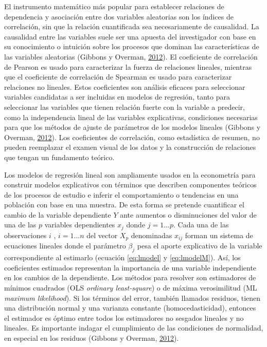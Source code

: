 \documentclass[12pt,a4paper,oneside, openany]{book}
\theoremstyle{definition}
\theoremstyle{definition}
\theoremstyle{definition}
\theoremstyle{remark}
\begin{document}
El instrumento matemático más popular para establecer relaciones de
dependencia y asociación entre dos variables aleatorias son los índices
de correlación, sin que la relación cuantificada sea necesariamente de
causalidad. La causalidad entre las variables suele ser una apuesta del
investigador con base en su conocimiento o intuición sobre los procesos
que dominan las características de las variables aleatorias (Gibbons y
Overman, \protect\hyperlink{ref-gibbons_mostly_2012}{2012}). El
coeficiente de correlación de Pearson es usado para caracterizar la
fuerza de relaciones lineales, mientras que el coeficiente de
correlación de Spearman es usado para caracterizar relaciones no
lineales. Estos coeficientes son análisis eficaces para seleccionar
variables candidatas a ser incluidas en modelos de regresión, tanto para
seleccionar las variables que tienen relación fuerte con la variable a
predecir, como la independencia lineal de las variables explicativas,
condiciones necesarias para que los métodos de ajuste de parámetros de
los modelos lineales (Gibbons y Overman,
\protect\hyperlink{ref-gibbons_mostly_2012}{2012}). Los coeficientes de
correlación, como estadística de resumen, no pueden reemplazar el examen
visual de los datos y la construcción de relaciones que tengan un
fundamento teórico.

Los modelos de regresión lineal son ampliamente usados en la econometría
para construir modelos explicativos con términos que describen
componentes teóricos de los procesos de estudio e inferir el
comportamiento o tendencias en una población con base en una muestra. De
esta forma se pretende cuantificar el cambio de la variable dependiente
\(Y\) ante aumentos o disminuciones del valor de una de las \(p\)
variables dependientes \(x_j\) donde \(j =1...p\). Cada una de las
observaciones \(i\) , \(i=1...n\) del vector \(X_p\) denominadas
\(x_{ij}\) forman un sistema de ecuaciones lineales donde el parámetro
\(\beta_j\) pesa el aporte explicativo de la variable correspondiente al
estimarlo (ecuación \eqref{eq:lmodel} y \eqref{eq:lmodelM}). Así, los
coeficientes estimados representan la importancia de una variable
independiente en los cambios de la dependiente. Los métodos para
resolver son estimadores de mínimos cuadrados (OLS \emph{ordinary
least-square}) o de máxima verosimilitud (ML \emph{maximum likelihood}).
Si los términos del error, también llamados residuos, tienen una
distribución normal y una varianza constante (homocedasticidad),
entonces el estimador es óptimo entre todos los estimadores no sesgados
lineales y no lineales. Es importante indagar el cumplimiento de las
condiciones de normalidad, en especial en los residuos (Gibbons y
Overman, \protect\hyperlink{ref-gibbons_mostly_2012}{2012}).
\end{document}
